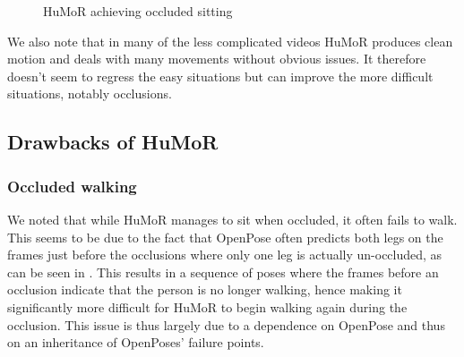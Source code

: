 \begin{figure}[!ht]
    \centering
    \hfil
    \hfil
    \caption{HuMoR achieving occluded sitting}
    \label{fig:humor_sitting}
\end{figure}

We also note that in many of the less complicated videos HuMoR produces clean motion and deals with many movements without obvious issues. It therefore doesn't seem to regress the easy situations but can improve the more difficult situations, notably occlusions.


\subsection{Drawbacks of HuMoR}

\subsubsection{Occluded walking}
We noted that while HuMoR manages to sit when occluded, it often fails to walk. This seems to be due to the fact that OpenPose \cite{openPose} often predicts both legs on the frames just before the occlusions where only one leg is actually un-occluded, as can be seen in . This results in a sequence of poses where the frames before an occlusion indicate that the person is no longer walking, hence making it significantly more difficult for HuMoR to begin walking again during the occlusion. This issue is thus largely due to a dependence on OpenPose and thus on an inheritance of OpenPoses' failure points.

